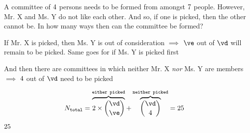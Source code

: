 



\SUBTRACT{}\vd
\SUBTRACT{}\ve

\question[2] A committee of $4$ persons needs to be formed from amongst $7$ people. However, 
Mr. X and Ms. Y do not like each other. And so, if one is picked, then the other cannot be. In how many 
ways then can the committee be formed?

\watchout[-30pt]

\begin{solution}[\mcq]
	If Mr. X is picked, then Ms. Y is out of consideration $\implies$ $\ve$ out of $\vd$ 
	will remain to be picked. Same goes for if Ms. Y is picked first

  And then there are committees in which neither Mr. X \textit{nor} Ms. Y are members $\implies$ 
  $4$ out of $\vd$ need to be picked
	
	\begin{align}
		N_{\texttt{total}} &= \overbrace{2\times\binom\vd\ve}^{\texttt{either picked}} + 
    \overbrace{\binom\vd\va}^{\texttt{neither picked}} = \vc
	\end{align}
\end{solution}

\ifprintanswers
  \begin{codex}
    $25$
  \end{codex}
\fi 

